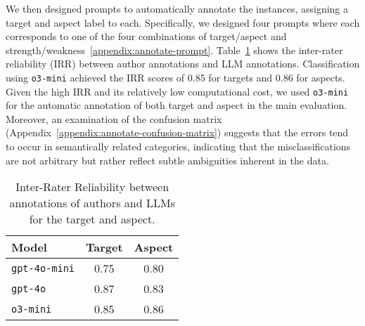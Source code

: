 We then designed prompts to automatically annotate the instances, assigning a target and aspect label to each. Specifically, we designed four prompts where each corresponds to one of the four combinations of target/aspect and strength/weakness~\ref{appendix:annotate-prompt}. Table~\ref{tab:model_scores} shows the inter-rater reliability (IRR) between author annotations and LLM annotations. Classification using \texttt{o3-mini} achieved the IRR scores of 0.85 for targets and 0.86 for aspects. Given the high IRR and its relatively low computational cost, we used \texttt{o3-mini} for the automatic annotation of both target and aspect in the main evaluation. Moreover, an examination of the confusion matrix (Appendix~\ref{appendix:annotate-confusion-matrix}) suggests that the errors tend to occur in semantically related categories, indicating that the misclassifications are not arbitrary but rather reflect subtle ambiguities inherent in the data.


\begin{table}[ht]
    \centering
    \begin{tabular}{lcc}
        \toprule
        \textbf{Model}       & \textbf{Target} & \textbf{Aspect} \\
        \midrule
        \texttt{gpt-4o-mini} & 0.75   & 0.80   \\
        \texttt{gpt-4o}      & 0.87   & 0.83   \\
        \texttt{o3-mini}     & 0.85   & 0.86   \\
        \bottomrule
    \end{tabular}
    \caption{Inter-Rater Reliability between annotations of authors and LLMs for the target and aspect.}
    \label{tab:model_scores}
\end{table}









